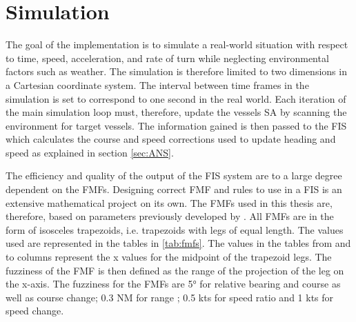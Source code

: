 \section{Simulation}
The goal of the implementation is to  simulate a real-world situation with respect to time, speed, acceleration, and rate of turn while neglecting  environmental factors such as weather.
The simulation is therefore limited to two dimensions in a Cartesian coordinate system.
The interval between time frames in the simulation is set to correspond to one second in the real world.
Each iteration of the main simulation loop must, therefore, update the vessels SA by scanning the environment for target vessels. The information gained is then passed to the FIS which calculates the course and speed corrections used to update heading and speed as explained in section \ref{sec:ANS}.

The efficiency and quality of the output of the FIS system are to a large degree dependent on the FMFs. Designing correct FMF and rules to use in a FIS is an extensive mathematical project on its own. The FMFs used in this thesis are, therefore, based on parameters  previously developed by \textcite{perera2010smooth_param}. All FMFs are in the form of isosceles trapezoids, i.e. trapezoids with legs of equal length. The values used are represented in the tables in \ref{tab:fmfs}. The values in the tables from and to columns represent the x values for the midpoint of the trapezoid legs. The fuzziness of the FMF is then defined as the range of the projection of the leg on the x-axis. The fuzziness for the FMFs are \ang{5} for relative bearing and course as well as course change; 0.3 NM for range ; 0.5 kts for speed ratio and 1 kts for speed change.

